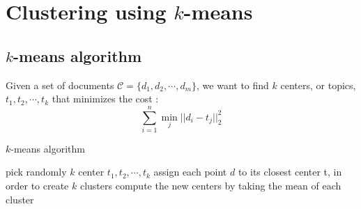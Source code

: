 \documentclass[a4paper,twoside,12pt,openright]{report}
\begin{document}

\newpage
\section{Clustering using $k$-means}

\subsection{$k$-means algorithm}
Given a set of documents $\mathcal{C} = \{d_1,d_2,\cdots,d_m\}$, we want to find $k$ centers, or topics, $t_1,t_2,\cdots,t_k$ that minimizes the cost :
$$ \sum_{i=1}^n \min_j ||d_i-t_j||_2^2 $$


\begin{algorithm}
\caption{$k$-means algorithm}
\label{algo:kmeans}
\begin{algorithmic} 
\STATE pick randomly $k$ center ${t_1,t_2,\cdots,t_k}$
\REPEAT
\STATE assign each point $d$ to its closest center t, in order to create $k$ clusters
\STATE compute the new centers by taking the mean of each cluster
\end{algorithmic}
\end{algorithm}
\end{document}
